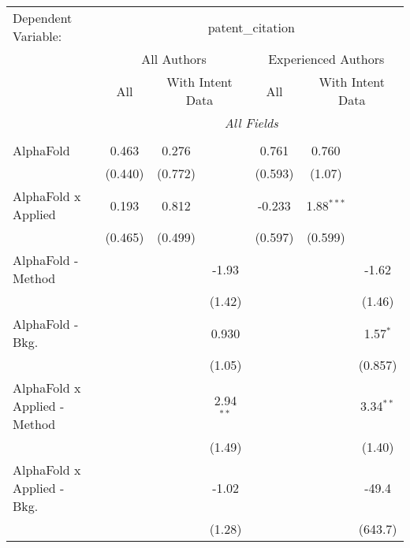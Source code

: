 \begingroup
\centering
\begin{tabular}{lcccccc}
   \tabularnewline \midrule \midrule
   Dependent Variable: & \multicolumn{6}{c}{patent\_citation}\\
 & \multicolumn{3}{c}{All Authors} & \multicolumn{3}{c}{Experienced Authors} \\
\cmidrule(lr){2-4} \cmidrule(lr){5-7}
 & \multicolumn{1}{c}{All} & \multicolumn{2}{c}{With Intent Data} & \multicolumn{1}{c}{All} & \multicolumn{2}{c}{With Intent Data} \\
\cmidrule(lr){2-2} \cmidrule(lr){3-4} \cmidrule(lr){5-5} \cmidrule(lr){6-7}
 & \multicolumn{6}{c}{\textit{All Fields}} \\ \\
   AlphaFold                      & 0.463          & 0.276      &               & 0.761          & 0.760        &   \\   
                                  & (0.440)        & (0.772)    &               & (0.593)        & (1.07)       &   \\   
   AlphaFold x Applied            & 0.193          & 0.812      &               & -0.233         & 1.88$^{***}$ &   \\   
                                  & (0.465)        & (0.499)    &               & (0.597)        & (0.599)      &   \\   
   AlphaFold - Method             &                &            & -1.93         &                &              & -1.62\\   
                                  &                &            & (1.42)        &                &              & (1.46)\\   
   AlphaFold - Bkg.               &                &            & 0.930         &                &              & 1.57$^{*}$\\   
                                  &                &            & (1.05)        &                &              & (0.857)\\   
   AlphaFold x Applied - Method   &                &            & 2.94$^{**}$   &                &              & 3.34$^{**}$\\   
                                  &                &            & (1.49)        &                &              & (1.40)\\   
   AlphaFold x Applied - Bkg.     &                &            & -1.02         &                &              & -49.4\\   
                                  &                &            & (1.28)        &                &              & (643.7)\\   

\end{tabular}

